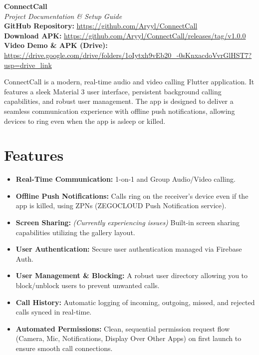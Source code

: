\documentclass[11pt,a4paper]{article}
\begin{document}
\begin{center}
    \vspace*{-1em}
    {\Huge \textbf{\textsf{ConnectCall}}} \\[1em]
    {\large \textit{Project Documentation \& Setup Guide}} \\[1.5em]
    
    \textbf{GitHub Repository:} \url{https://github.com/Aryyl/ConnectCall} \\
    \textbf{Download APK:} \url{https://github.com/Aryyl/ConnectCall/releases/tag/v1.0.0} \\
    \textbf{Video Demo \& APK (Drive):} \url{https://drive.google.com/drive/folders/1oIytxh9vEb20_-0sKnxacdoVvrGlHST7?usp=drive_link} \\[1.5em]
\end{center}

\noindent
ConnectCall is a modern, real-time audio and video calling Flutter application. It features a sleek Material 3 user interface, persistent background calling capabilities, and robust user management. The app is designed to deliver a seamless communication experience with offline push notifications, allowing devices to ring even when the app is asleep or killed.
\vspace{1em}

\section*{Features}
\begin{itemize}
    \item \textbf{Real-Time Communication:} 1-on-1 and Group Audio/Video calling.
    \item \textbf{Offline Push Notifications:} Calls ring on the receiver's device even if the app is killed, using ZPNs (ZEGOCLOUD Push Notification service).
    \item \textbf{Screen Sharing:} \textit{(Currently experiencing issues)} Built-in screen sharing capabilities utilizing the gallery layout.
    \item \textbf{User Authentication:} Secure user authentication managed via Firebase Auth.
    \item \textbf{User Management \& Blocking:} A robust user directory allowing you to block/unblock users to prevent unwanted calls.
    \item \textbf{Call History:} Automatic logging of incoming, outgoing, missed, and rejected calls synced in real-time.
    \item \textbf{Automated Permissions:} Clean, sequential permission request flow (Camera, Mic, Notifications, Display Over Other Apps) on first launch to ensure smooth call connections.
\end{itemize}
\end{document}
